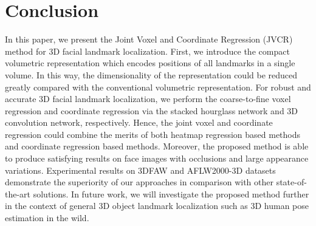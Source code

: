 \documentclass[a4paper,conference]{IEEEtran}
\begin{document}
\section{Conclusion}
\label{Conclusion}
In this paper, we present the Joint Voxel and Coordinate Regression (JVCR) method for 3D facial landmark localization. 
First, we introduce the compact volumetric representation which encodes positions of all landmarks in a single volume.
In this way, the dimensionality of the representation could be reduced greatly compared with the conventional volumetric representation.
For robust and accurate 3D facial landmark localization, we perform the coarse-to-fine voxel regression and coordinate regression via the stacked hourglass network and 3D convolution network, respectively.
Hence, the joint voxel and coordinate regression could combine the merits of both heatmap regression based methods and coordinate regression based methods.
Moreover, the proposed method is able to produce satisfying results on face images with occlusions and large appearance variations. 
Experimental results on 3DFAW and AFLW2000-3D datasets demonstrate the superiority of our approaches in comparison with other state-of-the-art solutions.
In future work, we will investigate the proposed method further in the context of general 3D object landmark localization such as 3D human pose estimation in the wild.




\end{document}
